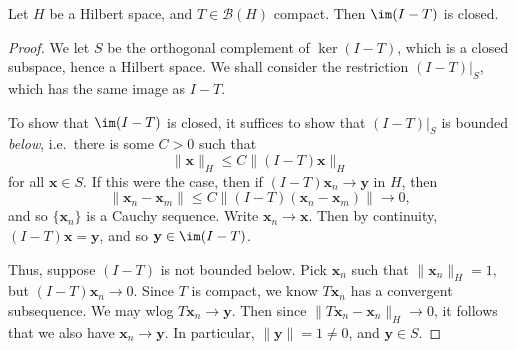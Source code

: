 \documentclass[a4paper]{article}
\begin{document}
\begin{lemma}
  Let $H$ be a Hilbert space, and $T \in \mathcal{B}(H)$ compact. Then $\im (I - T)$ is closed.
\end{lemma}

\begin{proof}
  We let $S$ be the orthogonal complement of $\ker (I - T)$, which is a closed subspace, hence a Hilbert space. We shall consider the restriction $(I - T)|_S$, which has the same image as $I - T$.


  To show that $\im (I - T)$ is closed, it suffices to show that $(I - T)|_S$ is bounded \emph{below}, i.e.\ there is some $C > 0$ such that
  \[
    \|\mathbf{x}\|_H \leq C \|(I - T) \mathbf{x}\|_H
  \]
  for all $\mathbf{x} \in S$. If this were the case, then if $(I - T) \mathbf{x}_n \to \mathbf{y}$ in $H$, then
  \[
    \|\mathbf{x}_n - \mathbf{x}_m\| \leq C \|(I - T)(\mathbf{x}_n - \mathbf{x}_m)\| \to 0,
  \]
  and so $\{\mathbf{x}_n\}$ is a Cauchy sequence. Write $\mathbf{x}_n \to \mathbf{x}$. Then by continuity, $(I - T)\mathbf{x} = \mathbf{y}$, and so $\mathbf{y} \in \im (I - T)$.

  Thus, suppose $(I - T)$ is not bounded below. Pick $\mathbf{x}_n$ such that $\|\mathbf{x}_n\|_H = 1$, but $(I - T)\mathbf{x}_n \to 0$. Since $T$ is compact, we know $T \mathbf{x}_n$ has a convergent subsequence. We may wlog $T \mathbf{x}_n \to \mathbf{y}$. Then since $\|T\mathbf{x}_n - \mathbf{x}_n\|_H \to 0$, it follows that we also have $\mathbf{x}_n \to \mathbf{y}$. In particular, $\|\mathbf{y}\| = 1 \not= 0$, and $\mathbf{y} \in S$.


\end{proof}
\end{document}
